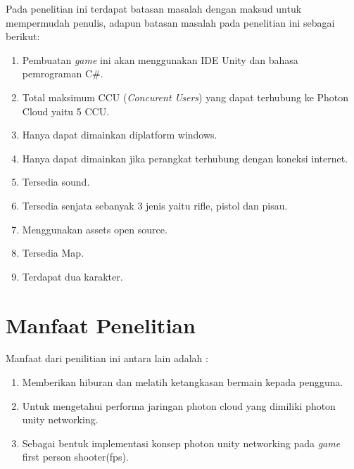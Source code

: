 Pada penelitian ini terdapat batasan masalah dengan maksud untuk mempermudah penulis, adapun batasan masalah pada penelitian ini sebagai berikut:
\begin{enumerate}
	\item Pembuatan \textit{\textit{game}} ini akan menggunakan IDE Unity dan bahasa pemrograman C\#.
	\item Total maksimum CCU (\textit{Concurent Users}) yang dapat terhubung ke Photon Cloud yaitu 5 CCU.
	\item Hanya dapat dimainkan diplatform windows.
	\item Hanya dapat dimainkan jika perangkat terhubung dengan koneksi internet.
	\item Tersedia sound.
	\item Tersedia senjata sebanyak 3 jenis yaitu rifle, pistol dan pisau.
	\item Menggunakan assets open source.
	\item Tersedia Map.
	\item Terdapat dua karakter.
\end{enumerate}

\section{Manfaat Penelitian}
Manfaat dari penilitian ini antara lain adalah : 
\begin{enumerate}
	\item Memberikan hiburan dan melatih ketangkasan bermain 
	kepada pengguna.
	\item Untuk mengetahui performa jaringan photon cloud yang dimiliki photon unity networking.
	\item Sebagai bentuk implementasi konsep photon unity networking pada \textit{\textit{game}} first person shooter(fps).
\end{enumerate}